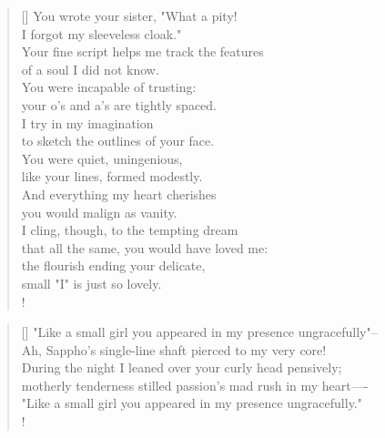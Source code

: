 \documentclass[]{article}
\begin{document}
\settowidth{\versewidth}{You wrote your sister, "What a pity!  }
\begin{verse}[\versewidth]
You wrote your sister, "What a pity!\\
I forgot my sleeveless cloak."\\
Your fine script helps me track the features\\
of a soul I did not know.\\
You were incapable of trusting:\\
your o's and a's are tightly spaced.\\
I try in my imagination\\
to sketch the outlines of your face.\\
You were quiet, uningenious,\\
like your lines, formed modestly.\\
And everything my heart cherishes\\
you would malign as vanity.\\
I cling, though, to the tempting dream\\
that all the same, you would have loved me:\\
the flourish ending your delicate,\\
small "I" is just so lovely.\\!
\end{verse}
\newpage

\settowidth{\versewidth}{"Like a small girl you appeared in my presence ungracefully"—- }
\begin{verse}[\versewidth]
"Like a small girl you appeared in my presence ungracefully"--\\
Ah, Sappho's single-line shaft pierced to my very core!\\
During the night I leaned over your curly head pensively;\\
motherly tenderness stilled passion's mad rush in my heart—- \\
"Like a small girl you appeared in my presence ungracefully."\\! 
\end{verse}
\bigskip \bigskip
\end{document}
